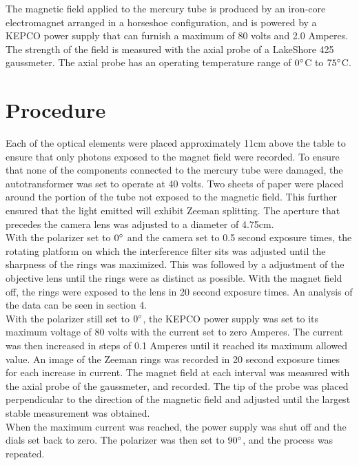\documentclass[12pt]{article}
\begin{document}
\noindent
The magnetic field applied to the mercury tube is produced by an iron-core electromagnet arranged in a horseshoe configuration, and is powered by a KEPCO power supply that can furnish a maximum of 80 volts and 2.0 Amperes. The strength of the field is measured with the axial probe of a LakeShore 425 gaussmeter. The axial probe has an operating temperature range of \cite{gaussmeter} $0\degree$C to $75\degree$C.
\section{Procedure}
Each of the optical elements were placed approximately 11cm above the table to ensure that only photons exposed to the magnet field were recorded. To ensure that none of the components connected to the mercury tube were damaged, the autotransformer was set to operate at 40 volts. Two sheets of paper were placed around the portion of the tube not exposed to the magnetic field. This further ensured that the light emitted will exhibit Zeeman splitting. The aperture that precedes the camera lens was adjusted to a diameter of 4.75cm.\\

\noindent
With the polarizer set to $0\degree$ and  the camera set to 0.5 second exposure times, the rotating platform on which the interference filter sits was adjusted until the sharpness of the rings was maximized. This was followed by a adjustment of the objective lens until the rings were as distinct as possible. With the magnet field off, the rings were exposed to the lens in 20 second exposure times. An analysis of the data can be seen in section 4.\\

\noindent
With the polarizer still set to $0\degree$, the KEPCO power supply was set to its maximum voltage of 80 volts with the current set to zero Amperes. The current was then increased in steps of 0.1 Amperes until it reached its maximum allowed value. An image of the Zeeman rings was recorded in 20 second exposure times for each increase in current. The magnet field at each interval was measured with the axial probe of the gaussmeter, and recorded. The tip of the probe was placed perpendicular to the direction of the magnetic field and adjusted until the largest stable measurement was obtained.\\

\noindent
When the maximum current was reached, the power supply was shut off and the dials set back to zero. The polarizer was then set to $90\degree$, and the process was repeated.
\end{document}
